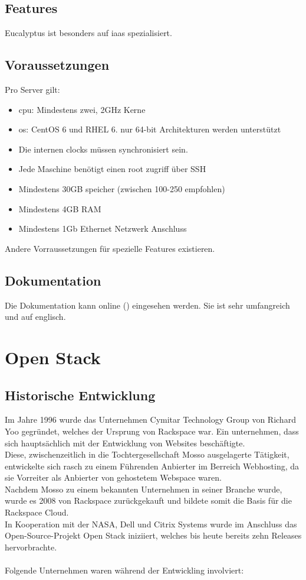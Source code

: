 \documentclass[a4paper,nochapterprefix,english,12pt]{scrreprt}
\begin{document}
\section{Features}
Eucalyptus ist besonders auf \gls{iaas} spezialisiert.
\newpage
\section{Voraussetzungen}
Pro Server gilt:
\begin{itemize}
\item \gls{cpu}: Mindestens zwei, 2GHz Kerne
\item \gls{os}:  CentOS 6 und RHEL 6. nur 64-bit Architekturen werden unterstützt
\item Die internen clocks müssen synchronisiert sein.
\item Jede Maschine benötigt einen root zugriff über SSH
\item Mindestens 30GB speicher (zwischen 100-250 empfohlen)
\item Mindestens 4GB RAM
\item Mindestens 1Gb Ethernet Netzwerk Anschluss
\end{itemize}
Andere Vorraussetzungen für spezielle Features existieren. \cite{EucalyptusRequ} \\
\section{Dokumentation}
Die Dokumentation kann online (\cite{EucalyptusDoc}) eingesehen werden.
Sie ist sehr umfangreich und auf englisch.


\chapter{Open Stack} \thispagestyle{fancy}
\section{Historische Entwicklung}
Im Jahre 1996 wurde das Unternehmen Cymitar Technology Group von Richard Yoo gegründet, welches der Ursprung von Rackspace war.
Ein unternehmen, dass sich hauptsächlich mit der Entwicklung von Websites beschäftigte.\\
Diese, zwischenzeitlich in die Tochtergesellschaft Mosso ausgelagerte Tätigkeit, entwickelte sich rasch zu einem Führenden Anbierter im Berreich Webhosting, da sie Vorreiter als Anbierter von gehostetem Webspace waren.\\
Nachdem Mosso zu einem bekannten Unternehmen in seiner Branche wurde, wurde es 2008 von Rackspace zurückgekauft und bildete somit die Basis für die Rackspace Cloud.\\
In Kooperation mit der NASA, Dell und Citrix Systems wurde im Anschluss das Open-Source-Projekt Open Stack iniziiert, welches bis heute bereits zehn Releases hervorbrachte.\\
\\
Folgende Unternehmen waren während der Entwickling involviert:
\end{document}
